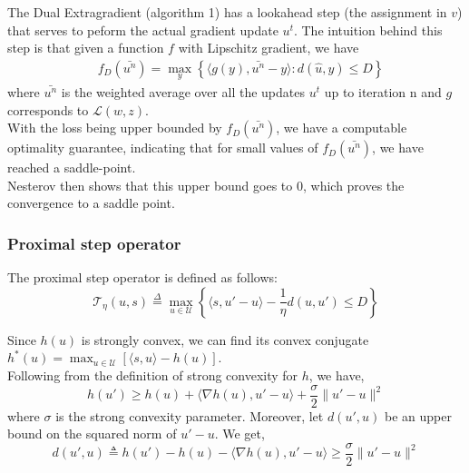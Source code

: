 \documentclass{article}
\begin{document}
The Dual Extragradient (algorithm 1) has a lookahead step (the assignment in $v$) that serves to peform the actual
gradient update $u^t$. The intuition behind this step is that given a
function $f$ with Lipschitz gradient, we have
\begin{equation*}
\begin{aligned}
    &f_{D}(\bar{u^n}) = \max_y \left \{ \langle g(y),\bar{u^n} - y\rangle : d(\hat{u},y) \leq D \right \}   
\end{aligned}
\end{equation*}
where $\bar{u^n}$ is the weighted
average over all the updates $u^t$ up to iteration n and $g$ corresponds
to $\mathcal{L}( w, z)$.\\
With the loss being upper bounded by $f_D(\bar{u^n})$, we have a computable optimality guarantee, indicating that for small values of $f_D(\bar{u^n})$, we have reached a saddle-point.\\
Nesterov then shows that this upper bound goes to $0$, which proves the convergence to a saddle point.
\subsubsection{Proximal step operator}
The proximal step operator \cite{Taskaretal06} is defined as follows:
\begin{equation}
  \mathcal{T}_{\eta}( u,  s) \overset{\Delta}{=} \max_{ u \in \mathcal{U}} \left \{ \langle  s,  u' -  u \rangle - \frac{1}{\eta}  d( u,  u') \leq D \right \}
\end{equation}

Since $h( u)$ is strongly convex, we can find its convex conjugate $h^*( u) = \max_{ u  \in \mathcal{U}} \left [ \langle  s,  u \rangle - h( u) \right ]$.\\
Following from the definition of strong convexity for $h$, we have,
\begin{equation}
  h( u') \geq h( u) + \langle \nabla h( u),  u'  -  u \rangle + \frac{\sigma}{2} \lVert  u' -  u \rVert^2
\end{equation}
where $\sigma$ is the strong convexity parameter. Moreover, let $d( u',  u)$ be an upper bound on the squared norm of $ u' -  u$. We get,
\begin{equation}
  d( u',  u) \triangleq h( u') - h( u) - \langle \nabla h( u),  u' -  u \rangle \geq \frac{\sigma}{2} \lVert  u' -  u \rVert^2
\end{equation}
\end{document}
